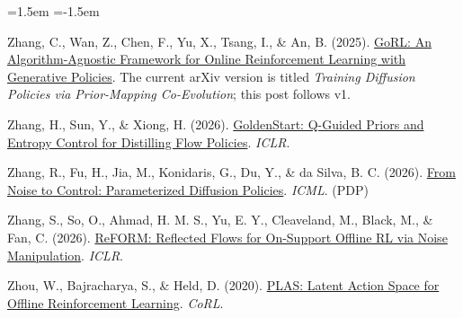 \begin{list}{}{\leftmargin=1.5em \itemindent=-1.5em \itemsep=2pt \parsep=0pt}
\item {}Zhang, C., Wan, Z., Chen, F., Yu, X., Tsang, I., \& An, B. (2025). \href{https://arxiv.org/abs/2512.02581v1}{GoRL: An Algorithm-Agnostic Framework for Online Reinforcement Learning with Generative Policies}. The current arXiv version is titled \emph{Training Diffusion Policies via Prior-Mapping Co-Evolution}; this post follows v1.
\item {}Zhang, H., Sun, Y., \& Xiong, H. (2026). \href{https://arxiv.org/abs/2603.14245}{GoldenStart: Q-Guided Priors and Entropy Control for Distilling Flow Policies}. \emph{ICLR}.
\item {}Zhang, R., Fu, H., Jia, M., Konidaris, G., Du, Y., \& da Silva, B. C. (2026). \href{https://arxiv.org/abs/2606.00336}{From Noise to Control: Parameterized Diffusion Policies}. \emph{ICML}. (PDP)
\item {}Zhang, S., So, O., Ahmad, H. M. S., Yu, E. Y., Cleaveland, M., Black, M., \& Fan, C. (2026). \href{https://arxiv.org/abs/2602.05051}{ReFORM: Reflected Flows for On-Support Offline RL via Noise Manipulation}. \emph{ICLR}.
\item {}Zhou, W., Bajracharya, S., \& Held, D. (2020). \href{https://arxiv.org/abs/2011.07213}{PLAS: Latent Action Space for Offline Reinforcement Learning}. \emph{CoRL}.
\end{list}
